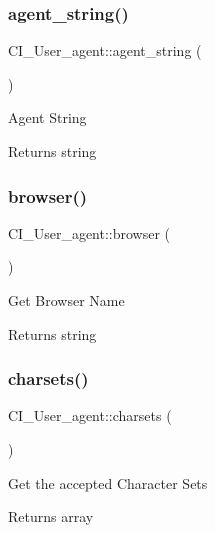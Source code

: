\subsubsection{\texorpdfstring{agent\+\_\+string()}{agent\_string()}}
{\footnotesize\ttfamily C\+I\+\_\+\+User\+\_\+agent\+::agent\+\_\+string (\begin{DoxyParamCaption}{ }\end{DoxyParamCaption})}

Agent String

\begin{DoxyReturn}{Returns}
string 
\end{DoxyReturn}
\mbox{\label{class_c_i___user__agent_a5a14c05298e3d01f82c562b0e1a8a3c6}} 
\subsubsection{\texorpdfstring{browser()}{browser()}}
{\footnotesize\ttfamily C\+I\+\_\+\+User\+\_\+agent\+::browser (\begin{DoxyParamCaption}{ }\end{DoxyParamCaption})}

Get Browser Name

\begin{DoxyReturn}{Returns}
string 
\end{DoxyReturn}
\mbox{\label{class_c_i___user__agent_a8a41120cc77aa7937953eb0f37635428}} 
\subsubsection{\texorpdfstring{charsets()}{charsets()}}
{\footnotesize\ttfamily C\+I\+\_\+\+User\+\_\+agent\+::charsets (\begin{DoxyParamCaption}{ }\end{DoxyParamCaption})}

Get the accepted Character Sets

\begin{DoxyReturn}{Returns}
array 
\end{DoxyReturn}
\mbox{\label{class_c_i___user__agent_ac3ede100994463947a4bf725ae71f1ec}} 
